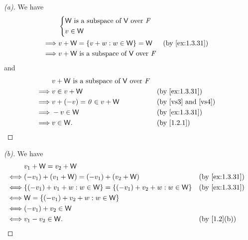 \begin{proof}[(a)]
  We have
  \begin{align*}
             & \begin{dcases}
                 \W \text{ is a subspace of } \V \text{ over } \F \\
                 v \in \W
               \end{dcases}                         \\
    \implies & v + \W = \set{v + w : w \in \W} = \W                 &  & \by{ex:1.3.31} \\
    \implies & v + \W \text{ is a subspace of } \V \text{ over } \F
  \end{align*}
  and
  \begin{align*}
             & v + \W \text{ is a subspace of } \V \text{ over } \F                                          \\
    \implies & v \in v + \W                                         &  & \by{ex:1.3.31}                      \\
    \implies & v + (-v) = \zv \in v + \W                            &  & \text{(by \ref{vs3} and \ref{vs4})} \\
    \implies & -v \in \W                                            &  & \by{ex:1.3.31}                      \\
    \implies & v \in \W.                                            &  & \by{1.2.1}
  \end{align*}
\end{proof}

\begin{proof}[(b)]
  We have
  \begin{align*}
         & v_1 + \W = v_2 + \W                                                                       \\
    \iff & (-v_1) + (v_1 + \W) = (-v_1) + (v_2 + \W)                             &  & \by{ex:1.3.31} \\
    \iff & \set{(-v_1) + v_1 + w : w \in \W} = \set{(-v_1) + v_2 + w : w \in \W} &  & \by{ex:1.3.31} \\
    \iff & \W = \set{(-v_1) + v_2 + w : w \in \W}                                                    \\
    \iff & (-v_1) + v_2 \in \W                                                                       \\
    \iff & v_1 - v_2 \in \W.                                                     &  & \by{1.2}[b]
  \end{align*}
\end{proof}

